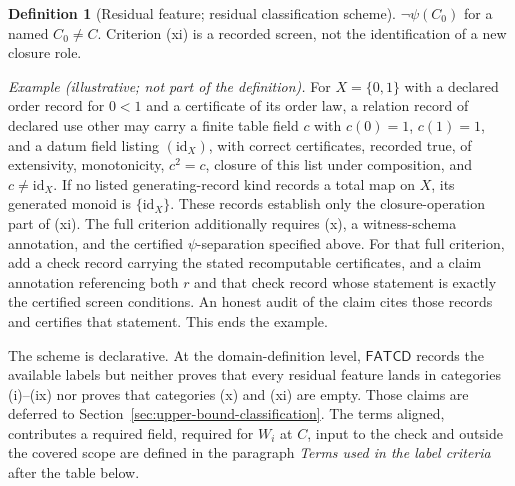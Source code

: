 \documentclass[11pt]{article}
\theoremstyle{definition}
\newtheorem{definition}[theorem]{Definition}
\newcommand{\FATCD}{\ensuremath{\mathsf{FATCD}}}
\begin{document}
\begin{definition}[Residual feature; residual classification scheme]
\(\neg\psi(C_0)\) for a named \(C_0\ne C\). Criterion (xi) is a recorded screen, not the identification of a new closure
role.
\par\emph{Example (illustrative; not part of the definition).} For \(X=\{0,1\}\) with a declared order record for \(0<1\) and a certificate of its order law, a relation record of declared use other may
carry a finite table field \(c\) with \(c(0)=1\), \(c(1)=1\), and a datum field
listing \((\mathrm{id}_X)\), with correct certificates, recorded true, of extensivity,
monotonicity, \(c^2=c\), closure of this list under composition, and
\(c\ne\mathrm{id}_X\). If no listed generating-record kind records a total map
on \(X\), its generated monoid is \(\{\mathrm{id}_X\}\). These records establish only the closure-operation part of (xi). The full
criterion additionally requires (x), a witness-schema annotation, and the
certified \(\psi\)-separation specified above. For that full criterion, add a check record carrying the stated recomputable
certificates, and a claim annotation referencing both \(r\) and that check
record whose statement is exactly the certified screen conditions. An honest
audit of the claim cites those records and certifies that statement. This ends
the example.
\par The scheme is declarative. At the domain-definition level, \FATCD{} records
the available labels but neither proves that every residual feature lands in
categories (i)--(ix) nor proves that categories (x) and (xi) are empty. Those
claims are deferred to Section~\ref{sec:upper-bound-classification}.
The terms aligned, contributes a required field, required for \(W_i\) at \(C\),
input to the check and outside the covered scope are defined in the paragraph
\emph{Terms used in the label criteria} after the table below.
\end{definition}
\end{document}
